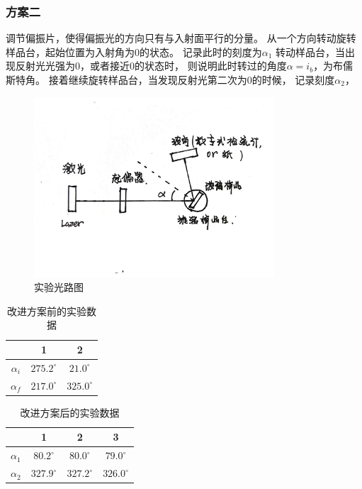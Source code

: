 \documentclass[a4paper,UTF8]{ctexart}
\begin{document}
\subsubsection{方案二}
调节偏振片，使得偏振光的方向只有与入射面平行的分量。
从一个方向转动旋转样品台，起始位置为入射角为0的状态。
记录此时的刻度为$\alpha_1$
转动样品台，当出现反射光光强为0，或者接近0的状态时，
则说明此时转过的角度$\alpha = i_b$，为布儒斯特角。
接着继续旋转样品台，当发现反射光第二次为0的时候，
记录刻度$\alpha_2$，

\begin{figure}[H]
    \centering
    \includegraphics[width=0.8\textwidth]{1.jpg}
    \caption{实验光路图}
\end{figure}
\begin{table}[htb]
    \begin{center}
        \begin{tabular}{|c|c|c|}
            \hline
            & \bfseries 1 & \bfseries 2 \\
            \hline
            \bfseries $\alpha_{i}$ & $275.2 ^\circ$ & $21.0 ^\circ$   \\
            \hline
            \bfseries $\alpha_{f}$ & $217.0^\circ$ & $325.0^\circ$ \\
            \hline
        \end{tabular}
    \end{center}
    \caption{改进方案前的实验数据}
\end{table}

\begin{table}[htb]
    \begin{center}
        \begin{tabular}{|c|c|c|c|}
            \hline
            & \bfseries 1 & \bfseries 2 & \bfseries 3 \\
            \hline
            \bfseries $\alpha_1$ & $80.2 ^\circ$ & $80.0 ^\circ$ & $79.0 ^\circ$ \\
            \hline
            \bfseries $\alpha_2$ & $327.9^\circ$ & $327.2 ^\circ$ & $326.0 ^\circ$ \\
            \hline
        \end{tabular}
    \end{center}
    \caption{改进方案后的实验数据}
\end{table}
\end{document}
